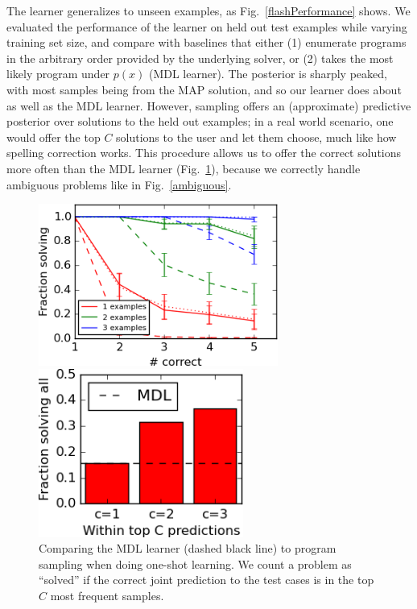 \documentclass{article}
\newcommand{\theSystem}{\textsc{ProgramSample}}
\begin{document}
The learner generalizes to unseen examples, as Fig.~\ref{flashPerformance} shows.
We evaluated the performance of the learner on held out test examples while varying training set size, and compare with baselines that either (1) enumerate programs in the arbitrary order provided by the underlying solver,
or (2) takes the most likely program under $p(x)$ (MDL learner).
The posterior is sharply peaked,
with most samples being from the MAP solution,
and so our learner does about as well as the MDL learner.
However,
sampling offers an (approximate) predictive posterior over solutions to the held out examples;
in a real world scenario, one would offer the top $C$ solutions to the user
and let them choose,
much like how spelling correction works.
This procedure allows us to offer the correct solutions more often than the MDL learner (Fig.~\ref{mdl}), because we correctly handle ambiguous problems like in Fig.~\ref{ambiguous}.
\begin{figure}\centering
  \begin{minipage}{0.45\textwidth}
    \includegraphics[width=0.7\textwidth]{smallFractionSolving.png}
  \caption{Generalization when learning text edit operations by example. Results averaged across 19 problems. Solid: 100 samples from \theSystem{} . Dashed: enumerating 100 programs. Dotted: MDL learner. Test cases past 1 (resp. 2,3) examples are held out when trained on 1 (resp. 2,3) examples.}\label{flashPerformance}        \end{minipage}%
\hspace{0.1\textwidth}\begin{minipage}{0.45\textwidth}\centering
    \includegraphics[width=0.6\textwidth]{small_mdl.png}
    \caption{Comparing the MDL learner (dashed black line) to program sampling when doing one-shot learning. We count a problem as ``solved'' if  the correct joint prediction to the test cases is in the top $C$ most frequent samples.}\label{mdl}
  \end{minipage}
 \end{figure}
\end{document}

